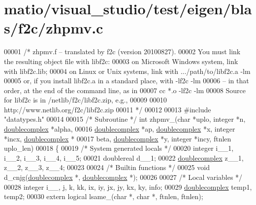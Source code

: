 \hypertarget{matio_2visual__studio_2test_2eigen_2blas_2f2c_2zhpmv_8c_source}{}\section{matio/visual\+\_\+studio/test/eigen/blas/f2c/zhpmv.c}
\label{matio_2visual__studio_2test_2eigen_2blas_2f2c_2zhpmv_8c_source}

\begin{DoxyCode}
00001 \textcolor{comment}{/* zhpmv.f -- translated by f2c (version 20100827).}
00002 \textcolor{comment}{   You must link the resulting object file with libf2c:}
00003 \textcolor{comment}{    on Microsoft Windows system, link with libf2c.lib;}
00004 \textcolor{comment}{    on Linux or Unix systems, link with .../path/to/libf2c.a -lm}
00005 \textcolor{comment}{    or, if you install libf2c.a in a standard place, with -lf2c -lm}
00006 \textcolor{comment}{    -- in that order, at the end of the command line, as in}
00007 \textcolor{comment}{        cc *.o -lf2c -lm}
00008 \textcolor{comment}{    Source for libf2c is in /netlib/f2c/libf2c.zip, e.g.,}
00009 \textcolor{comment}{}
00010 \textcolor{comment}{        http://www.netlib.org/f2c/libf2c.zip}
00011 \textcolor{comment}{*/}
00012 
00013 \textcolor{preprocessor}{#include "datatypes.h"}
00014 
00015 \textcolor{comment}{/* Subroutine */} \textcolor{keywordtype}{int} zhpmv\_(\textcolor{keywordtype}{char} *uplo, integer *n, \hyperlink{structdoublecomplex}{doublecomplex} *alpha, 
00016     \hyperlink{structdoublecomplex}{doublecomplex} *ap, \hyperlink{structdoublecomplex}{doublecomplex} *x, integer *incx, 
      \hyperlink{structdoublecomplex}{doublecomplex} *
00017     beta, \hyperlink{structdoublecomplex}{doublecomplex} *y, integer *incy, ftnlen uplo\_len)
00018 \{
00019     \textcolor{comment}{/* System generated locals */}
00020     integer i\_\_1, i\_\_2, i\_\_3, i\_\_4, i\_\_5;
00021     doublereal d\_\_1;
00022     \hyperlink{structdoublecomplex}{doublecomplex} z\_\_1, z\_\_2, z\_\_3, z\_\_4;
00023 
00024     \textcolor{comment}{/* Builtin functions */}
00025     \textcolor{keywordtype}{void} d\_cnjg(\hyperlink{structdoublecomplex}{doublecomplex} *, \hyperlink{structdoublecomplex}{doublecomplex} *);
00026 
00027     \textcolor{comment}{/* Local variables */}
00028     integer i\_\_, j, k, kk, ix, iy, jx, jy, kx, ky, info;
00029     \hyperlink{structdoublecomplex}{doublecomplex} temp1, temp2;
00030     \textcolor{keyword}{extern} logical lsame\_(\textcolor{keywordtype}{char} *, \textcolor{keywordtype}{char} *, ftnlen, ftnlen);

\end{DoxyCode}
